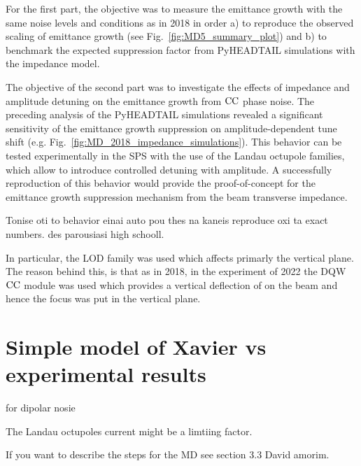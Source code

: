 For the first part, the objective was to measure the emittance growth with the same noise levels and conditions as in 2018 in order a) to reproduce the observed scaling of emittance growth (see Fig.~\ref{fig:MD5_summary_plot}) and b) to benchmark the expected suppression factor from PyHEADTAIL simulations  with the impedance model.

The objective of the second part was to investigate the effects of impedance and amplitude detuning on the emittance growth from ${\mathrm{CC}}$ phase noise. The preceding analysis of the PyHEADTAIL simulations revealed a significant sensitivity of the emittance growth suppression on amplitude-dependent tune shift (e.g. Fig.~\ref{fig:MD_2018_impedance_simulations}). This behavior can be tested experimentally in the SPS with the use of the Landau octupole families, which allow to introduce controlled detuning with amplitude. A successfully reproduction of this behavior would provide the proof-of-concept for the emittance growth suppression mechanism from the beam transverse impedance.




Tonise oti to behavior einai auto pou thes na kaneis reproduce oxi ta exact numbers. des parousiasi high schooll.


In particular, the LOD family was used which affects primarly the vertical plane. The reason behind this, is that as in 2018, in the experiment of 2022 the DQW ${\mathrm{CC}}$ module was used which provides a vertical deflection of on the beam and hence the focus was put in the vertical plane.





\section{Simple model of Xavier vs experimental results}
for dipolar nosie


The Landau octupoles current might be a limtiing factor.


If you want to describe the steps for the MD see section 3.3 David amorim.